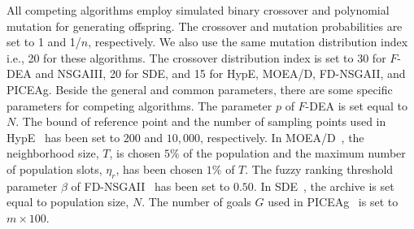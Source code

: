 \documentclass[review]{elsarticle}
\begin{document}
All competing algorithms employ simulated binary crossover and polynomial mutation for generating offspring. The crossover and mutation probabilities are set to 1 and 1/$n$, respectively. We also use the same mutation distribution index i.e., 20 for these algorithms.  The crossover distribution index is set to 30 for $F$-DEA and NSGAIII, 20 for SDE, and 15 for HypE, MOEA/D, FD-NSGAII, and PICEAg. 
Beside the general and common parameters, there are some specific parameters for competing algorithms. The parameter $p$ of $F$-DEA
is set equal to $N$. The bound of reference point and the number of sampling points
used in HypE~\citep{bader2011hype} has  been set to $200$ and $10,000$, respectively. In MOEA/D~\citep{zhang2007moea,li2009multiobjective}, the neighborhood size, $T$, is chosen $5\%$ of the population and the maximum number of population slots, $\eta_r$,  has been chosen $1\%$ of $T$. The fuzzy ranking threshold parameter $\beta$
of FD-NSGAII~\citep{he2014fuzzy} has been set to $0.50$. In SDE~\citep{sdealgorithm}, the archive is set equal to population size, $N$.
The number of goals $G$ used in PICEAg~\citep{piceag} is set to $m \times 100$.


%	
\end{document}
